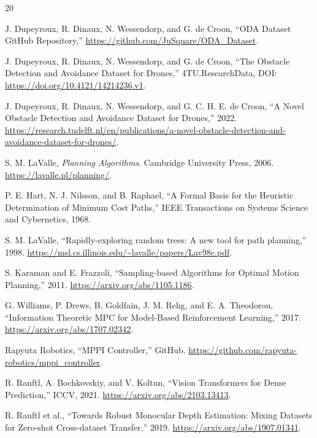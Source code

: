 \documentclass[10pt,a4paper]{article}
\begin{document}
\renewcommand{\refname}{Tài liệu tham khảo}
{\footnotesize
\begin{thebibliography}{20}
\setlength{\itemsep}{1pt}
\setlength{\parskip}{0pt}

J. Dupeyroux, R. Dinaux, N. Wessendorp, and G. de Croon, ``ODA Dataset GitHub Repository,'' \url{https://github.com/JuSquare/ODA_Dataset}.

J. Dupeyroux, R. Dinaux, N. Wessendorp, and G. de Croon, ``The Obstacle Detection and Avoidance Dataset for Drones,'' 4TU.ResearchData, DOI: \url{https://doi.org/10.4121/14214236.v1}.

J. Dupeyroux, R. Dinaux, N. Wessendorp, and G. C. H. E. de Croon, ``A Novel Obstacle Detection and Avoidance Dataset for Drones,'' 2022. \url{https://research.tudelft.nl/en/publications/a-novel-obstacle-detection-and-avoidance-dataset-for-drones/}.

S. M. LaValle, \textit{Planning Algorithms}. Cambridge University Press, 2006. \url{https://lavalle.pl/planning/}.

P. E. Hart, N. J. Nilsson, and B. Raphael, ``A Formal Basis for the Heuristic Determination of Minimum Cost Paths,'' IEEE Transactions on Systems Science and Cybernetics, 1968.

S. M. LaValle, ``Rapidly-exploring random trees: A new tool for path planning,'' 1998. \url{https://msl.cs.illinois.edu/~lavalle/papers/Lav98c.pdf}.

S. Karaman and E. Frazzoli, ``Sampling-based Algorithms for Optimal Motion Planning,'' 2011. \url{https://arxiv.org/abs/1105.1186}.

G. Williams, P. Drews, B. Goldfain, J. M. Rehg, and E. A. Theodorou, ``Information Theoretic MPC for Model-Based Reinforcement Learning,'' 2017. \url{https://arxiv.org/abs/1707.02342}.

Rapyuta Robotics, ``MPPI Controller,'' GitHub. \url{https://github.com/rapyuta-robotics/mppi_controller}.

R. Ranftl, A. Bochkovskiy, and V. Koltun, ``Vision Transformers for Dense Prediction,'' ICCV, 2021. \url{https://arxiv.org/abs/2103.13413}.

R. Ranftl et al., ``Towards Robust Monocular Depth Estimation: Mixing Datasets for Zero-shot Cross-dataset Transfer,'' 2019. \url{https://arxiv.org/abs/1907.01341}.


\end{thebibliography}}
\end{document}
